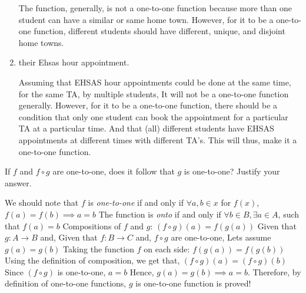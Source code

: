 \documentclass[addpoints]{exam}
\begin{document}
\begin{questions}
\begin{enumerate}[label=\alph*)]
    \begin{solution}
      The function, generally, is not a one-to-one function because more than one student can have a similar
      \newline or same home town.
      \newline However, for it to be a one-to-one function, different students should have different, unique, and disjoint home towns.
    \end{solution}
  \item their Ehsas hour appointment.
    \begin{solution}
      Assuming that EHSAS hour appointments could be done at the same time, for the same TA, by multiple students,
      \newline It will not be a one-to-one function generally.
      \newline However, for it to be a one-to-one function, there should be a condition that only one student can book the appointment for a 
      \newline particular TA at a particular time. And that (all) different students have EHSAS appointments at different times with different TA's. 
      \newline This will thus, make it a one-to-one function.
    \end{solution}
  \end{enumerate}


\question[5] If $f$ and $f \circ g$ are one-to-one, does it follow that $g$ is one-to-one? Justify your answer.
  \begin{solution}
    We should note that $f$ is \textit{one-to-one} if and only if $\forall a, b \in x$ for $f(x)$, $f(a) = f(b) \implies a=b $ 
    \newline The function is \textit{onto} if and only if $\forall b \in B, \exists a \in A$, such that $f(a)=b$
    \newline Compositions of $f$ and $g$: $(f \circ g)(a) = f(g(a))$
    \newline
    \newline Given that $g: A \rightarrow B$ and,
    \newline Given that $f: B \rightarrow C$ and,
    \newline $f \circ g$ are one-to-one,
    \newline 
    \newline Lets assume $g(a) = g(b)$
    \newline Taking the function $f$ on each side:
    \newline $f(g(a)) = f(g(b))$
    \newline Using the definition of composition, we get that,
    \newline $(f \circ g)(a) = (f \circ g)(b)$
    \newline Since $(f \circ g)$ is one-to-one, $a=b$
    \newline 
    \newline Hence, $g(a) = g(b) \implies a=b$. Therefore, by definition of one-to-one functions, $g$ is one-to-one function is proved!
  \end{solution}


\end{questions}
\end{document}
